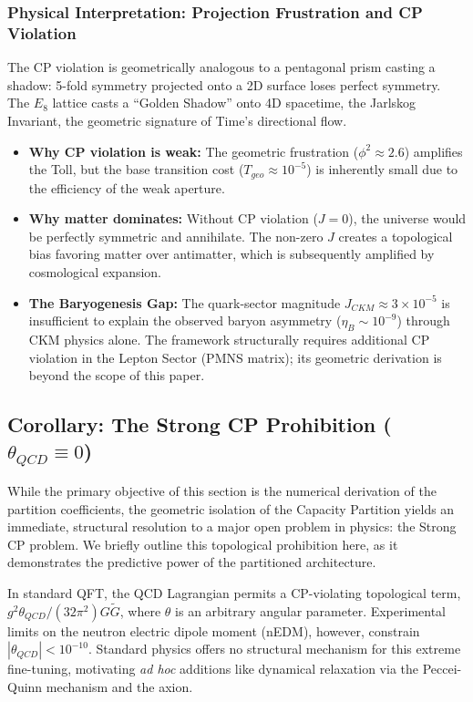 \subsubsection{Physical Interpretation: Projection Frustration and CP Violation}
The CP violation is geometrically analogous to a pentagonal prism casting a shadow: 5-fold symmetry projected onto a 2D surface loses perfect symmetry. The $E_8$ lattice casts a ``Golden Shadow'' onto 4D spacetime, the Jarlskog Invariant, the geometric signature of Time's directional flow.

\begin{itemize}
    \item \textbf{Why CP violation is weak:} The geometric frustration ($\phi^2 \approx 2.6$) amplifies the Toll, but the base transition cost ($T_{geo} \approx 10^{-5}$) is inherently small due to the efficiency of the weak aperture.
    
    \item \textbf{Why matter dominates:} Without CP violation ($J=0$), the universe would be perfectly symmetric and annihilate. The non-zero $J$ creates a topological bias favoring matter over antimatter, which is subsequently amplified by cosmological expansion.
    
    \item \textbf{The Baryogenesis Gap:} The quark-sector magnitude $J_{CKM}\approx3\times10^{-5}$ is insufficient to explain the observed baryon asymmetry ($\eta_B \sim 10^{-9}$) through CKM physics alone. The framework structurally requires additional CP violation in the Lepton Sector (PMNS matrix); its geometric derivation is beyond the scope of this paper.
\end{itemize}


\subsection{Corollary: The Strong CP Prohibition (\texorpdfstring{$\theta_{QCD} \equiv 0$}{theta\_QCD = 0})}
\label{sec:strong_cp_prohibition}

While the primary objective of this section is the numerical derivation of the partition coefficients, the geometric isolation of the Capacity Partition yields an immediate, structural resolution to a major open problem in physics: the Strong CP problem. We briefly outline this topological prohibition here, as it demonstrates the predictive power of the partitioned architecture.

In standard QFT, the QCD Lagrangian permits a CP-violating topological term, $g^2\theta_{QCD}/(32\pi^2) G\tilde{G}$, where $\theta$ is an arbitrary angular parameter. Experimental limits on the neutron electric dipole moment (nEDM), however, constrain $|\theta_{QCD}| < 10^{-10}$. Standard physics offers no structural mechanism for this extreme fine-tuning, motivating \textit{ad hoc} additions like dynamical relaxation via the Peccei-Quinn mechanism and the axion.

